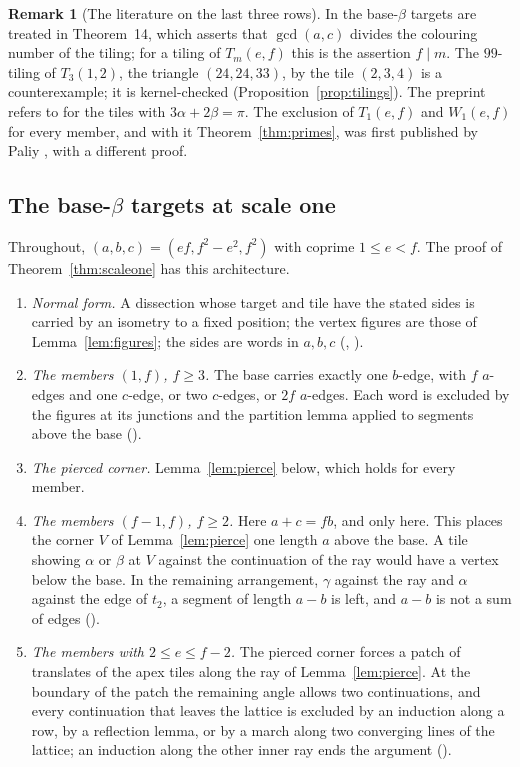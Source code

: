 \documentclass[11pt,reqno]{amsart}
\theoremstyle{plain}
\theoremstyle{definition}
\newtheorem{remark}[theorem]{Remark}
\begin{document}
\begin{remark}[The literature on the last three rows]\label{rem:thm14}
In \cite{BeesonIII} the base-$\beta$ targets are treated in Theorem~14, which asserts that $\gcd(a,c)$
divides the colouring number of the tiling; for a tiling of $T_m(e,f)$ this is the assertion $f\mid m$. The
$99$-tiling of $T_3(1,2)$, the triangle $(24,24,33)$, by the tile $(2,3,4)$ is a counterexample; it is
kernel-checked (Proposition~\ref{prop:tilings}). The preprint \cite{BeesonNoPrime} refers to
\cite{BeesonIII} for the tiles with $3\alpha+2\beta=\pi$. The exclusion of $T_1(e,f)$ and $W_1(e,f)$ for every
member, and with it Theorem~\ref{thm:primes}, was first published by Paliy \cite{PaliyPrime}, with a
different proof.
\end{remark}

\subsection{The base-$\beta$ targets at scale one}\label{sub:scaleone}
Throughout, $(a,b,c)=(ef,f^2-e^2,f^2)$ with coprime $1\le e<f$. The proof of Theorem~\ref{thm:scaleone} has
this architecture.
\begin{enumerate}
\item[1.] \emph{Normal form.} A dissection whose target and tile have the stated sides is carried by an
isometry to a fixed position; the vertex figures are those of Lemma~\ref{lem:figures}; the sides are words
in $a,b,c$ (, ).
\item[2.] \emph{The members $(1,f)$, $f\ge3$.} The base carries exactly one $b$-edge, with $f$ $a$-edges and
one $c$-edge, or two $c$-edges, or $2f$ $a$-edges. Each word is excluded by the figures at its junctions and
the partition lemma applied to segments above the base
().
\item[3.] \emph{The pierced corner.} Lemma~\ref{lem:pierce} below, which holds for every member.
\item[4.] \emph{The members $(f-1,f)$, $f\ge2$.} Here $a+c=fb$, and only here. This places the corner $V$ of
Lemma~\ref{lem:pierce} one length $a$ above the base. A tile showing $\alpha$ or $\beta$ at $V$ against the
continuation of the ray would have a vertex below the base. In the remaining arrangement, $\gamma$ against
the ray and $\alpha$ against the edge of $t_2$, a segment of length $a-b$ is left, and $a-b$ is not a sum of
edges ().
\item[5.] \emph{The members with $2\le e\le f-2$.} The pierced corner forces a patch of translates of the
apex tiles along the ray of Lemma~\ref{lem:pierce}. At the boundary of the patch the remaining angle allows
two continuations, and every continuation that leaves the lattice is excluded by an induction along a row,
by a reflection lemma, or by a march along two converging lines of the lattice; an induction along the
other inner ray ends the argument
().
\end{enumerate}
\end{document}
